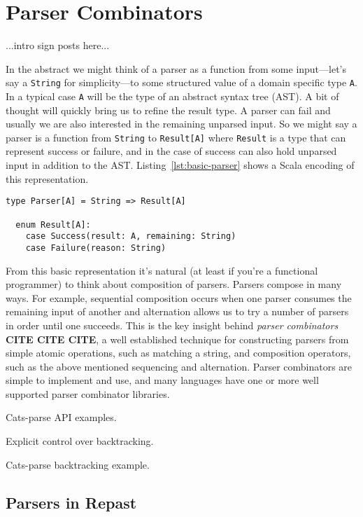\section{Parser Combinators}

...intro sign posts here...

In the abstract we might think of a parser as a function from some input---let's say a \lstinline{String} for simplicity---to some structured value of a domain specific type \lstinline{A}. In a typical case \lstinline{A} will be the type of an abstract syntax tree (AST). A bit of thought will quickly bring us to refine the result type. A parser can fail and usually we are also interested in the remaining unparsed input. So we might say a parser is a function from \lstinline{String} to \lstinline{Result[A]} where \lstinline{Result} is a type that can represent success or failure, and in the case of success can also hold unparsed input in addition to the AST. Listing~\ref{lst:basic-parser} shows a Scala encoding of this representation.

\begin{lstlisting}[frame=lines, caption={A basic \lstinline{Parser} type}, float=*, label=lst:basic-parser]
  type Parser[A] = String => Result[A]

  enum Result[A]:
    case Success(result: A, remaining: String)
    case Failure(reason: String)
\end{lstlisting}

From this basic representation it's natural (at least if you're a functional programmer) to think about composition of parsers. Parsers compose in many ways. For example, sequential composition occurs when one parser consumes the remaining input of another and alternation allows us to try a number of parsers in order until one succeeds. This is the key insight behind \emph{parser combinators} \textbf{CITE CITE CITE}, a well established technique for constructing parsers from simple atomic operations, such as matching a string, and composition operators, such as the above mentioned sequencing and alternation. Parser combinators are simple to implement and use, and many languages have one or more well supported parser combinator libraries.

Cats-parse API examples.

Explicit control over backtracking.

Cats-parse backtracking example.


\subsection{Parsers in Repast}

